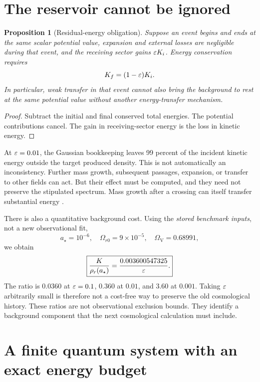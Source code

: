 \documentclass[11pt]{article}
\newtheorem{proposition}[theorem]{Proposition}
\theoremstyle{definition}\newtheorem{definition}[theorem]{Definition}
\begin{document}
\section{The reservoir cannot be ignored}
\begin{proposition}[Residual-energy obligation]
Suppose an event begins and ends at the same scalar potential value, expansion and external losses are negligible during that event, and the receiving sector gains $\varepsilon K_i$. Energy conservation requires
\begin{equation}
 K_f=(1-\varepsilon)K_i.
\end{equation}
In particular, weak transfer in that event cannot also bring the background to rest at the same potential value without another energy-transfer mechanism.
\end{proposition}
\begin{proof}
Subtract the initial and final conserved total energies. The potential contributions cancel. The gain in receiving-sector energy is the loss in kinetic energy.
\end{proof}

At $\varepsilon=0.01$, the Gaussian bookkeeping leaves 99 percent of the incident kinetic energy outside the target produced density. This is not automatically an inconsistency. Further mass growth, subsequent passages, expansion, or transfer to other fields can act. But their effect must be computed, and they need not preserve the stipulated spectrum. Mass growth after a crossing can itself transfer substantial energy \cite{instant}.

There is also a quantitative background cost. Using the \emph{stored benchmark inputs}, not a new observational fit,
\begin{equation}
 a_\star=10^{-6},\quad \Omega_{r0}=9\times10^{-5},\quad
 \Omega_{\mathrm V}=0.68991,
\end{equation}
we obtain
\begin{equation}
 \boxed{\frac{K}{\rho_r(a_\star)}=\frac{0.003600547325}{\varepsilon}.}
 \label{eq:radiation}
\end{equation}
The ratio is $0.0360$ at $\varepsilon=0.1$, $0.360$ at $0.01$, and $3.60$ at $0.001$. Taking $\varepsilon$ arbitrarily small is therefore not a cost-free way to preserve the old cosmological history. These ratios are not observational exclusion bounds. They identify a background component that the next cosmological calculation must include.

\section{A finite quantum system with an exact energy budget}
\end{document}
